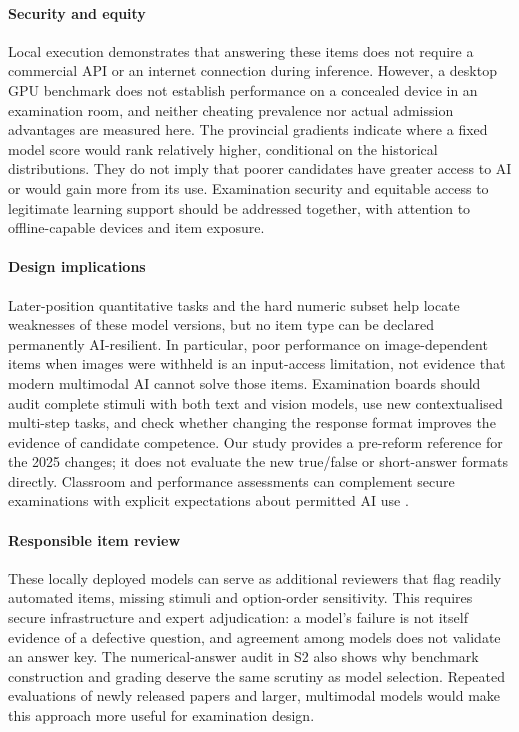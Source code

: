 \documentclass[preprint,12pt,authoryear,nonatbib]{elsarticle}
\begin{document}
\paragraph{Security and equity} Local execution demonstrates that answering these items does not require a commercial API or an internet connection during inference. However, a desktop GPU benchmark does not establish performance on a concealed device in an examination room, and neither cheating prevalence nor actual admission advantages are measured here. The provincial gradients indicate where a fixed model score would rank relatively higher, conditional on the historical distributions. They do not imply that poorer candidates have greater access to AI or would gain more from its use. Examination security and equitable access to legitimate learning support should be addressed together, with attention to offline-capable devices and item exposure.

\paragraph{Design implications} Later-position quantitative tasks and the hard numeric subset help locate weaknesses of these model versions, but no item type can be declared permanently AI-resilient. In particular, poor performance on image-dependent items when images were withheld is an input-access limitation, not evidence that modern multimodal AI cannot solve those items. Examination boards should audit complete stimuli with both text and vision models, use new contextualised multi-step tasks, and check whether changing the response format improves the evidence of candidate competence. Our study provides a pre-reform reference for the 2025 changes; it does not evaluate the new true/false or short-answer formats directly. Classroom and performance assessments can complement secure examinations with explicit expectations about permitted AI use \citep{perkins2024aias}.

\paragraph{Responsible item review} These locally deployed models can serve as additional reviewers that flag readily automated items, missing stimuli and option-order sensitivity. This requires secure infrastructure and expert adjudication: a model's failure is not itself evidence of a defective question, and agreement among models does not validate an answer key. The numerical-answer audit in S2 also shows why benchmark construction and grading deserve the same scrutiny as model selection. Repeated evaluations of newly released papers and larger, multimodal models would make this approach more useful for examination design.
\end{document}
